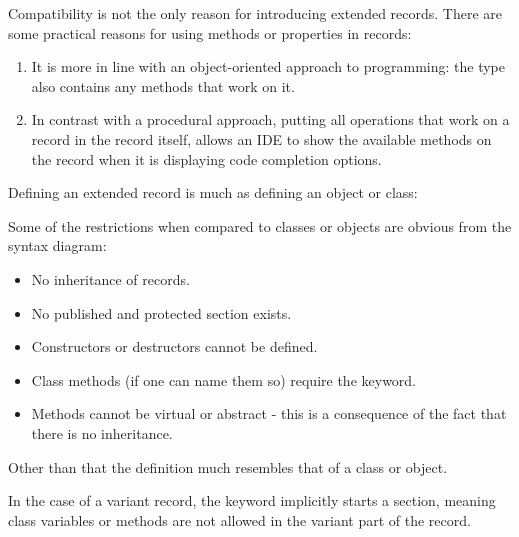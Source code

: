 Compatibility is not the only reason for introducing extended records. 
There are some practical reasons for using methods or properties in records: 
\begin{enumerate}
\item It is more in line with an object-oriented approach to programming:
the type also contains any methods that work on it.
\item In contrast with a procedural approach, putting all operations that
work on a record in the record itself, allows an IDE to show the available
methods on the record when it is displaying code completion options.
\end{enumerate}

Defining an extended record is much as defining an object or class:

Some of the restrictions when compared to classes or objects are 
obvious from the syntax diagram:
\begin{itemize}
\item No inheritance of records.
\item No published and protected section exists. 
\item Constructors or destructors cannot be defined.
\item Class methods (if one can name them so) require the  keyword.
\item Methods cannot be virtual or abstract - this is a consequence
of the fact that there is no inheritance.
\end{itemize}
Other than that the definition much resembles that of a class or object.

\begin{remark}
In the case of a variant record, the  keyword implicitly starts a
 section, meaning class variables or methods are not allowed in the
variant part of the record.
\end{remark}


